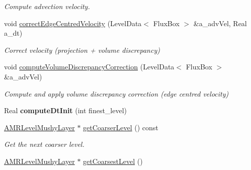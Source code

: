 \begin{DoxyCompactItemize}
\begin{DoxyCompactList}\small\item\em Compute advection velocity. \end{DoxyCompactList}\item 
\hypertarget{class_a_m_r_level_mushy_layer_adbe81ed4dc8e5b76516390d359df16f7}{void \hyperlink{class_a_m_r_level_mushy_layer_adbe81ed4dc8e5b76516390d359df16f7}{correct\-Edge\-Centred\-Velocity} (Level\-Data$<$ Flux\-Box $>$ \&a\-\_\-adv\-Vel, Real a\-\_\-dt)}\label{class_a_m_r_level_mushy_layer_adbe81ed4dc8e5b76516390d359df16f7}

\begin{DoxyCompactList}\small\item\em Correct velocity (projection + volume discrepancy) \end{DoxyCompactList}\item 
\hypertarget{class_a_m_r_level_mushy_layer_ac35bf0ea694dbcba6b12ec5cdf5fbd67}{void \hyperlink{class_a_m_r_level_mushy_layer_ac35bf0ea694dbcba6b12ec5cdf5fbd67}{compute\-Volume\-Discrepancy\-Correction} (Level\-Data$<$ Flux\-Box $>$ \&a\-\_\-adv\-Vel)}\label{class_a_m_r_level_mushy_layer_ac35bf0ea694dbcba6b12ec5cdf5fbd67}

\begin{DoxyCompactList}\small\item\em Compute and apply volume discrepancy correction (edge centred velocity) \end{DoxyCompactList}\item 
\hypertarget{class_a_m_r_level_mushy_layer_aa6359d3a5c627812a89197d5ccb0a597}{Real {\bfseries compute\-Dt\-Init} (int finest\-\_\-level)}\label{class_a_m_r_level_mushy_layer_aa6359d3a5c627812a89197d5ccb0a597}

\item 
\hypertarget{class_a_m_r_level_mushy_layer_a9e20bcf141ad788f0ba357797cdeabea}{\hyperlink{class_a_m_r_level_mushy_layer}{A\-M\-R\-Level\-Mushy\-Layer} $\ast$ \hyperlink{class_a_m_r_level_mushy_layer_a9e20bcf141ad788f0ba357797cdeabea}{get\-Coarser\-Level} () const }\label{class_a_m_r_level_mushy_layer_a9e20bcf141ad788f0ba357797cdeabea}

\begin{DoxyCompactList}\small\item\em Get the next coarser level. \end{DoxyCompactList}\item 
\hypertarget{class_a_m_r_level_mushy_layer_a077bec843072abfd8ed2a23dfee10d56}{\hyperlink{class_a_m_r_level_mushy_layer}{A\-M\-R\-Level\-Mushy\-Layer} $\ast$ \hyperlink{class_a_m_r_level_mushy_layer_a077bec843072abfd8ed2a23dfee10d56}{get\-Coarsest\-Level} ()}\label{class_a_m_r_level_mushy_layer_a077bec843072abfd8ed2a23dfee10d56}


\end{DoxyCompactItemize}
